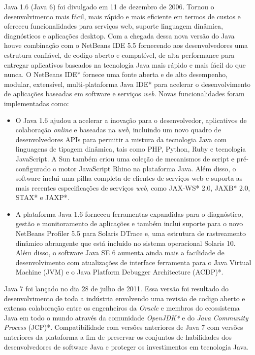 Java 1.6 (Java 6) foi divulgado em 11 de dezembro de 2006. Tornou o desenvolvimento mais fácil, mais rápido e mais eficiente em termos de custos e ofereceu funcionalidades para serviços web, suporte linguagem dinâmica, diagnósticos e aplicações desktop. Com a chegada dessa nova versão do Java houve combinação com o NetBeans IDE 5.5 fornecendo aos desenvolvedores uma estrutura confiável, de codigo aberto e compatível, de alta performance para entregar aplicativos baseados na tecnologia Java mais rápido e mais fácil do que nunca. O NetBeans IDE* fornece uma fonte aberta e de alto desempenho, modular, extensível, multi-plataforma Java IDE* para acelerar o desenvolvimento de aplicações baseadas em software e serviços {\it web}.
Novas funcionalidades foram implementadas como:

\begin{itemize}
  \item O Java 1.6 ajudou a acelerar a inovação para o desenvolvedor, aplicativos de colaboração {\it online} e baseadas na {\it web}, incluindo um novo quadro de desenvolvedores APIs para permitir a mistura da tecnologia Java com linguagens de tipagem dinâmica, tais como PHP, Python, Ruby e tecnologia JavaScript. A Sun também criou uma coleção de mecanismos de script e pré-configurado o motor JavaScript Rhino na plataforma Java. Além disso, o software inclui uma pilha completa de clientes de serviços web e suporta as mais recentes especificações de serviços {\it web}, como JAX-WS* 2.0, JAXB* 2.0, STAX* e JAXP*.
  \item A plataforma Java 1.6 forneceu ferramentas expandidas para o diagnóstico, gestão e monitoramento de aplicações e também inclui suporte para o novo NetBeans Profiler 5.5 para Solaris DTrace e, uma estrutura de rastreamento dinâmico abrangente que está incluído no sistema operacional Solaris 10. Além disso, o software Java SE 6 aumenta ainda mais a facilidade de desenvolvimento com atualizações de interface ferramenta para o Java Virtual Machine (JVM) e o Java Platform Debugger Architecture (ACDP)*.
\end{itemize}

Java 7 foi lançado no dia 28 de julho de 2011. Essa versão foi resultado do desenvolvimento de toda a indústria envolvendo uma revisão de codigo aberto e extensa colaboração entre os engenheiros da {\it Oracle} e membros do ecossistema Java em todo o mundo através da comunidade {\it OpenJDK*} e do {\it Java Community Process} (JCP)*. Compatibilidade com versões anteriores de Java 7 com versões anteriores da plataforma a fim de preservar os conjuntos de habilidades dos desenvolvedores de software Java e proteger os investimentos em tecnologia Java.

